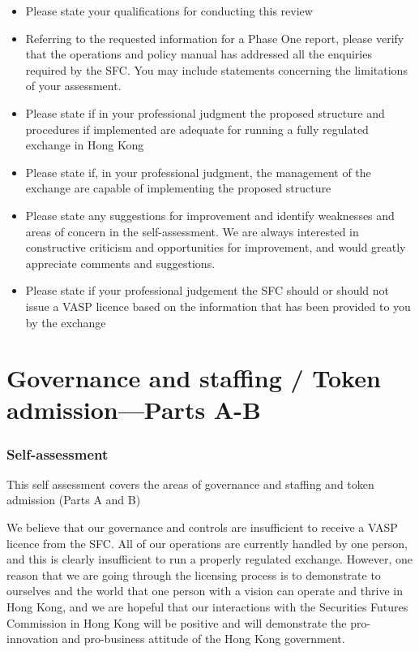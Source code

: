 \documentclass[]{report}
\begin{document}
\begin{itemize}
\item  Please state your qualifications for conducting this review

\item Referring to the requested information for a Phase One report,
  please verify that the operations and policy manual has addressed
  all the enquiries required by the SFC.  You may include statements
  concerning the limitations of your assessment.

\item Please state if in your professional judgment the proposed
  structure and procedures if implemented are adequate for running a
  fully regulated exchange in Hong Kong

\item Please state if, in your professional judgment, the management
  of the exchange are capable of implementing the proposed structure

\item Please state any suggestions for improvement and identify
  weaknesses and areas of concern in the self-assessment.  We are
  always interested in constructive criticism and opportunities for
  improvement, and would greatly appreciate comments and suggestions.

\item Please state if your professional judgement the SFC should or
  should not issue a VASP licence based on the information that has
  been provided to you by the exchange
\end{itemize}

\chapter{Governance and staffing / Token admission—Parts A-B}
\subsection{Self-assessment}
This self assessment covers the areas of governance and staffing and
token admission (Parts A and B)

We believe that our governance and controls are insufficient
to receive a VASP licence from the SFC.  All of our operations are
currently handled by one person, and this is clearly insufficient to
run a properly regulated exchange.  However, one reason that we are
going through the licensing process is to demonstrate to ourselves and
the world that one person with a vision can operate and thrive in Hong
Kong, and we are hopeful that our interactions with the Securities
Futures Commission in Hong Kong will be positive and will demonstrate
the pro-innovation and pro-business attitude of the Hong Kong
government.
\end{document}
